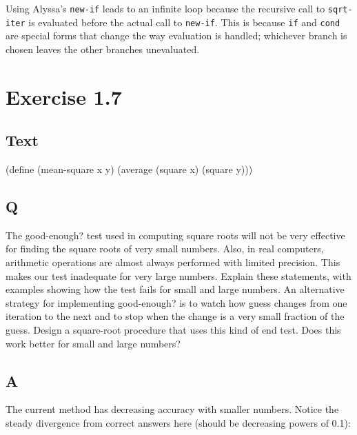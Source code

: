 \documentclass[
]{article}
\newenvironment{Shaded}{}{}
\newcommand{\ExtensionTok}[1]{#1}
\newcommand{\FunctionTok}[1]{\textcolor[rgb]{0.02,0.16,0.49}{#1}}
\newcommand{\NormalTok}[1]{#1}
\begin{document}
Using Alyssa's \texttt{new-if} leads to an infinite loop because the
recursive call to \texttt{sqrt-iter} is evaluated before the actual call
to \texttt{new-if}. This is because \texttt{if} and \texttt{cond} are
special forms that change the way evaluation is handled; whichever
branch is chosen leaves the other branches unevaluated.

\hypertarget{exercise-1.7}{%
\section{Exercise 1.7}\label{exercise-1.7}}

\hypertarget{text-1}{%
\subsection{Text}\label{text-1}}

\hypertarget{mean-square}{%
\label{mean-square}}%
\begin{Shaded}
\begin{Highlighting}[numbers=left,,]
\NormalTok{(}\ExtensionTok{define}\FunctionTok{ }\NormalTok{(mean{-}square x y)}
\NormalTok{  (average (square x) (square y)))}
\end{Highlighting}
\end{Shaded}

\hypertarget{q-6}{%
\subsection{Q}\label{q-6}}

The good-enough? test used in computing square roots will not be very
effective for finding the square roots of very small numbers. Also, in
real computers, arithmetic operations are almost always performed with
limited precision. This makes our test inadequate for very large
numbers. Explain these statements, with examples showing how the test
fails for small and large numbers. An alternative strategy for
implementing good-enough? is to watch how guess changes from one
iteration to the next and to stop when the change is a very small
fraction of the guess. Design a square-root procedure that uses this
kind of end test. Does this work better for small and large numbers?

\hypertarget{a-6}{%
\subsection{A}\label{a-6}}

The current method has decreasing accuracy with smaller numbers. Notice
the steady divergence from correct answers here (should be decreasing
powers of 0.1):
\end{document}
